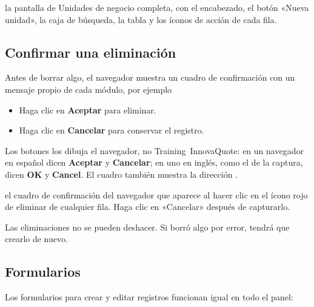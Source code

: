   {la pantalla de Unidades de negocio completa, con el encabezado, el botón «Nueva unidad»,
   la caja de búsqueda, la tabla y los íconos de acción de cada fila.}

\subsection{Confirmar una eliminación}\label{sec:confirmar}

Antes de borrar algo, el navegador muestra un cuadro de confirmación con un mensaje propio de
cada módulo, por ejemplo 

\begin{itemize}
  \item Haga clic en \textbf{Aceptar} para eliminar.
  \item Haga clic en \textbf{Cancelar} para conservar el registro.
\end{itemize}
Los botones los dibuja el navegador, no Training~InnovaQuote: en un navegador en español dicen
\textbf{Aceptar} y \textbf{Cancelar}; en uno en inglés, como el de la captura, dicen
\textbf{OK} y \textbf{Cancel}. El cuadro también muestra la dirección \ruta{\dominio}.

  {el cuadro de confirmación del navegador que aparece al hacer clic en el ícono rojo de
   eliminar de cualquier fila. Haga clic en «Cancelar» después de capturarlo.}

\begin{importante}
Las eliminaciones no se pueden deshacer. Si borró algo por error, tendrá que crearlo de nuevo.
\end{importante}

\subsection{Formularios}\label{sec:formularios}

Los formularios para crear y editar registros funcionan igual en todo el panel:

